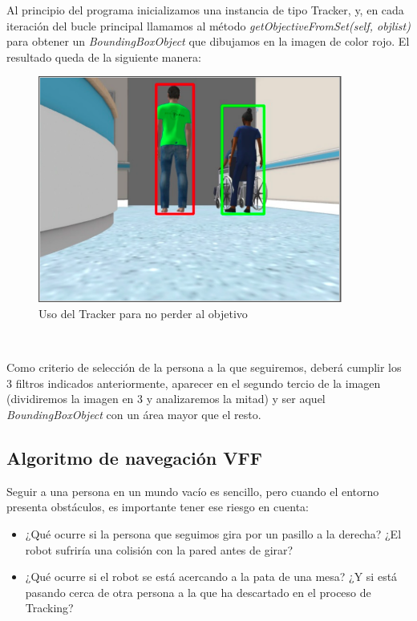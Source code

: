 Al principio del programa inicializamos una instancia de tipo Tracker, y, en cada iteración del bucle principal llamamos al método \textit{getObjectiveFromSet(self, objlist)} para obtener un \textit{BoundingBoxObject} que dibujamos en la imagen de color rojo. El resultado queda de la siguiente manera:\\

\begin{figure} [H]
  \begin{center}
    \includegraphics[width=10cm]{imagenes/cap6/aplicando-tracker.png}
  \end{center}
  \caption[Usando el Tracker para no perder al objetivo]{Uso del Tracker para no perder al objetivo}
  \label{fig:uso_tracker}
\end{figure}\

Como criterio de selección de la persona a la que seguiremos, deberá cumplir los 3 filtros indicados anteriormente, aparecer en el segundo tercio de la imagen (dividiremos la imagen en 3 y analizaremos la mitad) y ser aquel \textit{BoundingBoxObject} con un área mayor que el resto.\\


\subsection{Algoritmo de navegación VFF}
\label{subsec:vff}

Seguir a una persona en un mundo vacío es sencillo, pero cuando el entorno presenta obstáculos, es importante tener ese riesgo en cuenta:

\begin{itemize}
	\item ¿Qué ocurre si la persona que seguimos gira por un pasillo a la derecha? ¿El robot sufriría una colisión con la pared antes de girar?
	\item ¿Qué ocurre si el robot se está acercando a la pata de una mesa? ¿Y si está pasando cerca de otra persona a la que ha descartado en el proceso de Tracking?
\end{itemize}

